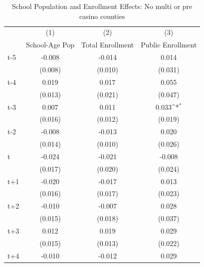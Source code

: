\begin{table}[htbp]\centering
\def\sym#1{\ifmmode^{#1}\else\(^{#1}\)\fi}
\caption{School Population and Enrollment Effects: No multi or pre casino counties}
\begin{tabular}{l*{3}{c}}
\hline\hline
            &\multicolumn{1}{c}{(1)}&\multicolumn{1}{c}{(2)}&\multicolumn{1}{c}{(3)}\\
            &\multicolumn{1}{c}{School-Age Pop}&\multicolumn{1}{c}{Total Enrollment}&\multicolumn{1}{c}{Public Enrollment}\\
\hline
t-5         &      -0.008         &      -0.014         &       0.014         \\
            &     (0.008)         &     (0.010)         &     (0.031)         \\
[1em]
t-4         &       0.019         &       0.017         &       0.055         \\
            &     (0.013)         &     (0.021)         &     (0.047)         \\
[1em]
t-3         &       0.007         &       0.011         &       0.033\sym{*}  \\
            &     (0.016)         &     (0.012)         &     (0.019)         \\
[1em]
t-2         &      -0.008         &      -0.013         &       0.020         \\
            &     (0.014)         &     (0.010)         &     (0.026)         \\
[1em]
t           &      -0.024         &      -0.021         &      -0.008         \\
            &     (0.017)         &     (0.020)         &     (0.024)         \\
[1em]
t+1         &      -0.020         &      -0.017         &       0.013         \\
            &     (0.016)         &     (0.017)         &     (0.023)         \\
[1em]
t+2         &      -0.010         &      -0.007         &       0.028         \\
            &     (0.015)         &     (0.018)         &     (0.037)         \\
[1em]
t+3         &       0.012         &       0.019         &       0.029         \\
            &     (0.015)         &     (0.013)         &     (0.022)         \\
[1em]
t+4         &      -0.010         &      -0.012         &       0.029         \\

\end{tabular}
\end{table}

